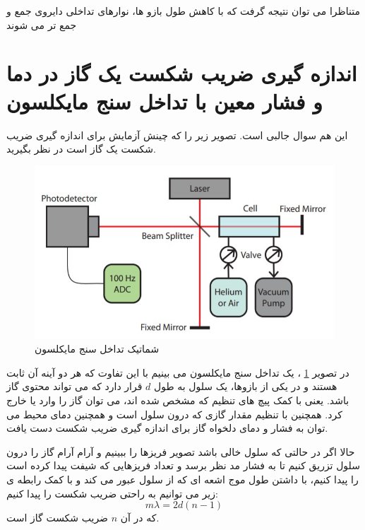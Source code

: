 \documentclass{article}
\begin{document}
\noindent
متناظرا می توان نتیجه گرفت که با کاهش طول بازو ها، نوارهای تداخلی دایروی جمع و جمع تر می شوند
\section{ اندازه گیری ضریب شکست یک گاز در دما و فشار معین با تداخل سنج مایکلسون
}
این هم سوال جالبی است. تصویر زیر را که چینش آزمایش برای اندازه گیری ضریب شکست یک گاز است در نظر بگیرید.
\begin{figure}[h]
	\centering
	\includegraphics[scale=0.7]{3.jpg}
	\caption{شماتیک تداخل سنج مایکلسون}
	\label{Fig3}
\end{figure}

\noindent
در تصویر
\ref{Fig3}
، یک تداخل سنج مایکلسون می بینیم با این تفاوت که هر دو آینه آن ثابت هستند و در یکی از بازوها، یک سلول به طول 
$d$ قرار دارد که
می تواند محتوی گاز باشد. یعنی با کمک پیچ های تنظیم که مشخص شده اند، می توان گاز را وارد یا خارج کرد. همچنین با تنظیم مقدار گازی که درون سلول است و همچنین دمای محیط می توان به فشار و دمای دلخواه گاز برای اندازه گیری ضریب شکست دست یافت.

\noindent
حالا اگر در حالتی که سلول خالی باشد تصویر فریزها را ببینیم و آرام آرام گاز را درون سلول تزریق کنیم تا به فشار مد نظر برسد و تعداد فریزهایی که شیفت پیدا کرده است را پیدا کنیم، با داشتن طول موج اشعه ای که از سلول عبور می کند و با کمک رابطه ی زیر می توانیم به راحتی ضریب شکست را پیدا کنیم:
\[
m\lambda =2d(n-1)
\]
که در آن $n$ ضریب شکست گاز است.
\end{document}

